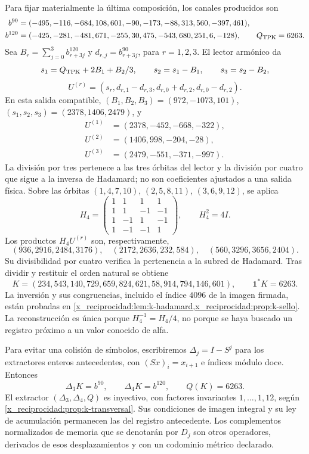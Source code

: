 Para fijar materialmente la última composición, los canales producidos son
\begin{align*}
 b^{90}&=(-495,-116,-684,108,601,-90,
                -173,-88,313,560,-397,461),\\
 b^{120}&=(-425,-281,-481,671,-255,30,
                 475,-543,680,251,6,-128),\qquad Q_{\rm TPK}=6263.
\end{align*}
Sea \(B_r=\sum_{j=0}^3b^{120}_{r+3j}\) y
\(d_{r,j}=b^{90}_{r+3j}\), para \(r=1,2,3\). El lector armónico da
\[
 s_1=\frac{Q_{\rm TPK}+2B_1+B_2}{3},\qquad
 s_2=s_1-B_1,\qquad s_3=s_2-B_2,
\]
\[
 U^{(r)}=(s_r,d_{r,1}-d_{r,3},d_{r,0}+d_{r,2},d_{r,0}-d_{r,2}).
\]
En esta salida compatible, \((B_1,B_2,B_3)=(972,-1073,101)\),
\((s_1,s_2,s_3)=(2378,1406,2479)\), y
\begin{align*}
 U^{(1)}&=(2378,-452,-668,-322),\\
 U^{(2)}&=(1406,998,-204,-28),\\
 U^{(3)}&=(2479,-551,-371,-997).
\end{align*}
La división por tres pertenece a las tres órbitas del lector y la división
por cuatro que sigue a la inversa de Hadamard; no son coeficientes ajustados
a una salida física. Sobre las órbitas
\((1,4,7,10)\), \((2,5,8,11)\), \((3,6,9,12)\), se aplica
\[
 H_4=\begin{pmatrix}
 1&1&1&1\\1&1&-1&-1\\1&-1&1&-1\\1&-1&-1&1
 \end{pmatrix},\qquad H_4^2=4I.
\]
Los productos \(H_4U^{(r)}\) son, respectivamente,
\[
 (936,2916,2484,3176),\quad(2172,2636,232,584),
 \quad(560,3296,3656,2404).
\]
Su divisibilidad por cuatro verifica la pertenencia a la subred de
Hadamard. Tras dividir y restituir el orden natural se obtiene
\begin{equation}
 K=(234,543,140,729,659,824,621,58,914,794,146,601),
 \qquad\mathbf1^*K=6263.
 \label{x_reciprocidad:lib01:K}
\end{equation}
La inversión y sus congruencias, incluido el índice \(4096\) de la imagen
firmada, están probadas en \cref{x_reciprocidad:lem:k-hadamard,x_reciprocidad:prop:k-sello}. La
reconstrucción es única porque \(H_4^{-1}=H_4/4\), no porque se haya
buscado un registro próximo a un valor conocido de alfa.

Para evitar una colisión de símbolos, escribiremos
\(\Delta_j=I-S^j\) para los extractores enteros antecedentes, con
\((Sx)_i=x_{i+1}\) e índices módulo doce. Entonces
\[
 \Delta_3K=b^{90},\qquad \Delta_4K=b^{120},\qquad Q(K)=6263.
\]
El extractor \((\Delta_3,\Delta_4,Q)\) es inyectivo, con factores
invariantes \(1,\ldots,1,12\), según \cref{x_reciprocidad:prop:k-transversal}. Sus
condiciones de imagen integral y su ley de acumulación permanecen las del
registro antecedente. Los complementos normalizados de memoria que se
denotarán por \(D_j\) son otros operadores, derivados de esos
desplazamientos y con un codominio métrico declarado.

